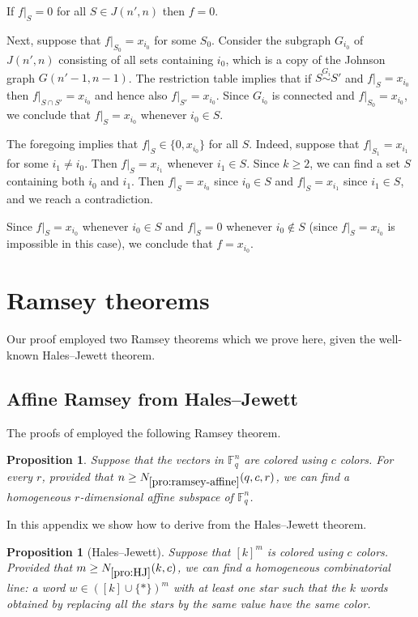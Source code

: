 \documentclass{article}
\newtheorem{proposition}[theorem]{Proposition}
\theoremstyle{definition}
\providecommand{\FF}{\mathbb{F}}
\providecommand{\Nramaff}{N_{\ref{pro:ramsey-affine}}}
\providecommand{\NHJ}{N_{\ref{pro:HJ}}}
\begin{document}
If $f|_S = 0$ for all $S \in J(n',n)$ then $f = 0$.

Next, suppose that $f|_{S_0} = x_{i_0}$ for some $S_0$. Consider the subgraph $G_{i_0}$ of $J(n',n)$ consisting of all sets containing ${i_0}$, which is a copy of the Johnson graph $G(n'-1,n-1)$. The restriction table implies that if $S \stackrel{G_i}\sim S'$ and $f|_S = x_{i_0}$ then $f|_{S \cap S'} = x_{i_0}$ and hence also $f|_{S'} = x_{i_0}$. Since $G_{i_0}$ is connected and $f|_{S_0} = x_{i_0}$, we conclude that $f|_S = x_{i_0}$ whenever $i_0 \in S$.

The foregoing implies that $f|_S \in \{0, x_{i_0}\}$ for all $S$. Indeed, suppose that $f|_{S_1} = x_{i_1}$ for some $i_1 \neq i_0$. Then $f|_S = x_{i_1}$ whenever $i_1 \in S$. Since $k \ge 2$, we can find a set $S$ containing both $i_0$ and $i_1$. Then $f|_S = x_{i_0}$ since $i_0 \in S$ and $f|_S = x_{i_1}$ since $i_1 \in S$, and we reach a contradiction.

Since $f|_S = x_{i_0}$ whenever $i_0 \in S$ and $f|_S = 0$ whenever $i_0 \notin S$ (since $f|_S = x_{i_0}$ is impossible in this case), we conclude that $f = x_{i_0}$.

\section{Ramsey theorems}
\label{sec:ramsey}

Our proof employed two Ramsey theorems which we prove here, given the well-known Hales--Jewett theorem.

\subsection{Affine Ramsey from Hales--Jewett}
\label{sec:ramsey-affine}

The proofs of  employed the following Ramsey theorem.

\begin{proposition} \label{pro:ramsey-affine}
Suppose that the vectors in $\FF_q^n$ are colored using $c$ colors. For every $r$, provided that $n \ge \Nramaff(q,c,r)$, we can find a homogeneous $r$-dimensional affine subspace of $\FF_q^n$.
\end{proposition}

In this appendix we show how to derive  from the Hales--Jewett theorem.

\begin{proposition}[Hales--Jewett] \label{pro:HJ}
Suppose that $[k]^m$ is colored using $c$ colors. Provided that $m \ge \NHJ(k,c)$, we can find a homogeneous \emph{combinatorial line}: a word $w \in ([k] \cup \{*\})^m$ with at least one star such that the $k$ words obtained by replacing all the stars by the same value have the same color.
\end{proposition}
\end{document}
